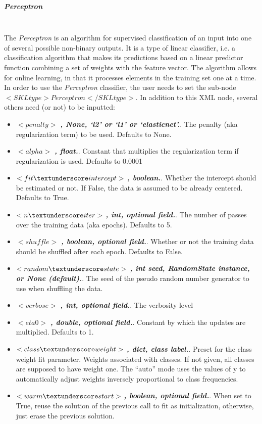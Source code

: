 \subparagraph{Perceptron}
\mbox{}
\\The \textit{Perceptron} is an algorithm for supervised classification of an input into one of several possible non-binary outputs. It is a type of linear classifier, i.e. a classification algorithm that makes its predictions based on a linear predictor function combining a set of weights with the feature vector. The algorithm allows for online learning, in that it processes elements in the training set one at a time.
\\In order to use the \textit{Perceptron} classifier, the user needs to set the sub-node $<SKLtype>Perceptron</SKLtype>$.
In addition to this XML node, several others need (or not) to be inputted:
\begin{itemize}
  \item $<penalty>$ \textbf{\textit{, None, ‘l2’ or ‘l1’ or ‘elasticnet’.}}. The penalty (aka regularization term) to be used. Defaults to None.
  \item $<alpha>$ \textbf{\textit{, float.}}. Constant that multiplies the regularization term if regularization is used. Defaults to 0.0001
  \item $<fit \textunderscore intercept>$ \textbf{\textit{, boolean.}}. Whether the intercept should be estimated or not. If False, the data is assumed to be already centered. Defaults to True.
  \item $<n \textunderscore iter>$ \textbf{\textit{, int, optional field.}}. The number of passes over the training data (aka epochs). Defaults to 5.
  \item $<shuffle>$ \textbf{\textit{, boolean, optional field.}}. Whether or not the training data should be shuffled after each epoch. Defaults to False.
  \item $<random \textunderscore state>$ \textbf{\textit{, int seed, RandomState instance, or None (default).}}. The seed of the pseudo random number generator to use when shuffling the data.
  \item $<verbose>$ \textbf{\textit{, int, optional field.}}. The verbosity level
  \item $<eta0>$ \textbf{\textit{, double, optional field.}}. Constant by which the updates are multiplied. Defaults to 1.
  \item $<class \textunderscore weight>$ \textbf{\textit{, dict, {class \textunderscore label}.}}. Preset for the class \textunderscore weight fit parameter. Weights associated with classes. If not given, all classes are supposed to have weight one. The “auto” mode uses the values of y to automatically adjust weights inversely proportional to class frequencies.
  \item $<warm \textunderscore start>$ \textbf{\textit{, boolean, optional field.}}. When set to True, reuse the solution of the previous call to fit as initialization, otherwise, just erase the previous solution.
\end{itemize}

